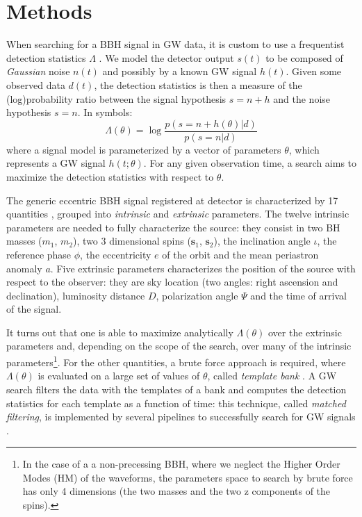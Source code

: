 \documentclass[twocolumn,showpacs,preprintnumbers,nofootinbib,prd,
superscriptaddress,10pt]{revtex4-2}
\begin{document}
\section{Methods} \label{sec:methods}

When searching for a BBH signal in GW data, it is custom to use a frequentist detection statistics $\Lambda$ \cite{Creighton_book, PhysRevD.94.024012}.
We model the detector output $s(t)$ to be composed of {\it Gaussian} noise $n(t)$ and possibly by a known GW signal $h(t)$.
Given some observed data $d(t)$, the detection statistics is then a measure of the (log)probability ratio between the signal hypothesis $s = n+h$ and the noise hypothesis $s = n$.
In symbols:
\begin{equation}\label{eq:LL}
	\Lambda(\theta) = \log\frac{p(s = n+h(\theta)|d)}{p(s = n|d)}
\end{equation}
where a signal model is parameterized by a vector of parameters $\theta$, which represents a GW signal $h(t;\theta)$.
For any given observation time, a search aims to maximize the detection statistics with respect to $\theta$. 

The generic eccentric BBH signal registered at detector is characterized by 17 quantities \cite{Sathyaprakash_2009}, grouped into \textit{intrinsic} and \textit{extrinsic} parameters.
The twelve intrinsic parameters are needed to fully characterize the source: they consist in two BH masses ($m_1$, $m_2$), two 3 dimensional spins ($\mathbf{s}_1$, $\mathbf{s}_2$), the inclination angle $\iota$, the reference phase $\phi$, the eccentricity $e$ of the orbit and the mean periastron anomaly $a$.
Five extrinsic parameters characterizes the position of the source with respect to the observer: they are sky location (two angles: right ascension and declination), luminosity distance $D$, polarization angle $\Psi$ and the time of arrival of the signal.

It turns out that one is able to maximize analytically $\Lambda(\theta)$ over the extrinsic parameters and, depending on the scope of the search, over many of the intrinsic parameters\footnote{
In the case of a a non-precessing BBH, where we neglect the Higher Order Modes (HM) of the waveforms, the parameters space to search by brute force has only 4 dimensions (the two masses and the two z components of the spins).
}.
For the other quantities, a brute force approach is required, where $\Lambda(\theta)$ is evaluated on a large set of values of $\theta$, called {\it template bank} \cite{PhysRevD.77.104017, Mukherjee_2021}.
A GW search filters the data with the templates of a bank and computes the detection statistics for each template as a function of time: this technique, called {\it matched filtering}, is implemented by several pipelines to successfully search for GW signals \cite{Usman:2015kfa,PhysRevD.95.042001,gstlal_paper2, Aubin:2020goo, Chu:2020pjv}.
\end{document}
